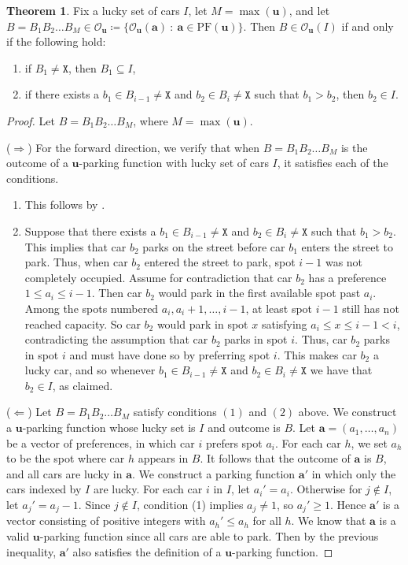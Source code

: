 \documentclass[reqno]{amsart}
\newcommand{\X}{\texttt{X}}
\def\O{\mathcal{O}}
\newcommand{\PF}{\mathrm{PF}}
\theoremstyle{definition}
\newtheorem{theorem}{Theorem}[section]
\theoremstyle{remark}
\newcommand{\out}{\mathcal{O}}
\newcommand{\bsy}{\boldsymbol}
\begin{document}
\begin{theorem}\label{thm:upfs characterization}
Fix a lucky set of cars $I$, let $M=\max{(\bsy{u})}$, and let $B=B_1B_2\ldots B_M\in \O_{\bsy{u}}\coloneqq\{\out_{\bsy{u}}(\bsy{a})~:~\bsy{a}\in\PF(\bsy{u})\}$.
Then $B \in \O_{\bsy{u}}(I)$
if and only if the following hold:
\begin{enumerate}
    \item if $B_1\neq \X$, then $B_1\subseteq I$,
    \item if there exists a $b_1\in B_{i-1}\neq \X$ and $b_2\in B_{i}\neq \X$ such that $b_1>b_2$, then $b_2\in I$.
\end{enumerate}
\end{theorem}

\begin{proof}
Let $B=B_1B_2\ldots B_M$, where $M=\max{(\bsy{u})}$.

($\Rightarrow$) For the forward direction, we verify that when $B=B_1B_2\ldots B_M$ is the outcome of a $\bsy{u}$-parking function with lucky set of cars $I$, it satisfies each of the conditions. 
\begin{enumerate}
    \item This follows by . 
    \item Suppose that there exists a $b_1\in B_{i-1}\neq \X$ and $b_2\in B_{i}\neq \X$ such that $b_1>b_2$. This implies that car $b_2$ parks on the street before car $b_1$ enters the street to park. Thus, when car $b_2$ entered the street to park, spot $i-1$ was not completely occupied. Assume for contradiction that car $b_2$ has a preference $1\leq a_i\leq i-1$. Then car $b_2$ would park in the first available spot past $a_i$. Among the spots numbered $a_i,a_i+1,\ldots, i-1$, at least spot $i-1$ still has not reached capacity. So car $b_2$ would park in spot $x$ satisfying $a_i\leq x\leq i-1<i$, contradicting the assumption that car $b_2$ parks in spot $i$. Thus, car $b_2$ parks in spot $i$ and must have done so by preferring spot $i$. This makes car $b_2$ a lucky car, and so whenever $b_1\in B_{i-1}\neq \X$ and $b_2\in B_i\neq \X$ we have that $b_2\in I$, as claimed.
\end{enumerate}

($\Leftarrow$) Let $B=B_1B_2\ldots B_M $ satisfy conditions $(1)$ and $(2)$ above. We construct a $\bsy u$-parking function whose lucky set is $I$ and outcome is $B$. Let $\bsy{a} = (a_1,\ldots, a_n)$ be a vector of preferences, in which car $i$ prefers spot $a_i$. For each car $h$, we set $a_h$ to be the spot where car $h$ appears in $B$. It follows that the outcome of $\bsy a$ is $B$, and all cars are lucky in $\bsy a$.
We construct a parking function $\bsy{a}'$ in which only the cars indexed by $I$ are lucky. For each car $i$ in $I$, let $a_i' = a_i$. Otherwise for $j \notin I$, let $a_j' = a_j-1$. Since $j \notin I$, condition (1) implies $a_j \neq 1$, so $a_j'\geq 1$. Hence $\bsy{a}'$ is a vector consisting of positive integers with $a_h'\leq a_h$ for all $h$. We know that $\bsy{a}$ is a valid $\bsy u$-parking function since all cars are able to park. Then by the previous inequality, $\bsy{a}'$ also satisfies the definition of a $\bsy u$-parking function.


\end{proof}
\end{document}
